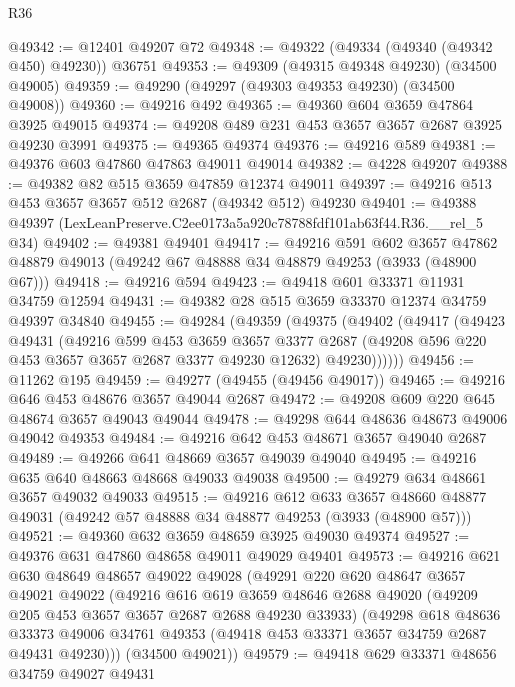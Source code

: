 \begin{lexlean}{R36}
\begin{coremodule}
@49342 := @12401 @49207 @72
@49348 := @49322 (@49334 (@49340 (@49342 @450) @49230)) @36751
@49353 := @49309 (@49315 @49348 @49230) (@34500 @49005)
@49359 := @49290 (@49297 (@49303 @49353 @49230) (@34500 @49008))
@49360 := @49216 @492
@49365 := @49360 @604 @3659 @47864 @3925 @49015
@49374 := @49208 @489 @231 @453 @3657 @3657 @2687 @3925 @49230 @3991
@49375 := @49365 @49374
@49376 := @49216 @589
@49381 := @49376 @603 @47860 @47863 @49011 @49014
@49382 := @4228 @49207
@49388 := @49382 @82 @515 @3659 @47859 @12374 @49011
@49397 := @49216 @513 @453 @3657 @3657 @512 @2687 (@49342 @512) @49230
@49401 := @49388 @49397 (LexLeanPreserve.C2ee0173a5a920c78788fdf101ab63f44.R36.__rel_5 @34)
@49402 := @49381 @49401
@49417 := @49216
    @591
    @602
    @3657
    @47862
    @48879
    @49013
    (@49242 @67 @48888 @34 @48879 @49253 (@3933 (@48900 @67)))
@49418 := @49216 @594
@49423 := @49418 @601 @33371 @11931 @34759 @12594
@49431 := @49382 @28 @515 @3659 @33370 @12374 @34759 @49397 @34840
@49455 := @49284
    (@49359
      (@49375
        (@49402
          (@49417
            (@49423
              @49431
              (@49216
                @599
                @453
                @3659
                @3657
                @3377
                @2687
                (@49208 @596 @220 @453 @3657 @3657 @2687 @3377 @49230 @12632)
                @49230))))))
@49456 := @11262 @195
@49459 := @49277 (@49455 (@49456 @49017))
@49465 := @49216 @646 @453 @48676 @3657 @49044 @2687
@49472 := @49208 @609 @220 @645 @48674 @3657 @49043 @49044
@49478 := @49298 @644 @48636 @48673 @49006 @49042 @49353
@49484 := @49216 @642 @453 @48671 @3657 @49040 @2687
@49489 := @49266 @641 @48669 @3657 @49039 @49040
@49495 := @49216 @635 @640 @48663 @48668 @49033 @49038
@49500 := @49279 @634 @48661 @3657 @49032 @49033
@49515 := @49216
    @612
    @633
    @3657
    @48660
    @48877
    @49031
    (@49242 @57 @48888 @34 @48877 @49253 (@3933 (@48900 @57)))
@49521 := @49360 @632 @3659 @48659 @3925 @49030 @49374
@49527 := @49376 @631 @47860 @48658 @49011 @49029 @49401
@49573 := @49216
    @621
    @630
    @48649
    @48657
    @49022
    @49028
    (@49291
      @220
      @620
      @48647
      @3657
      @49021
      @49022
      (@49216
        @616
        @619
        @3659
        @48646
        @2688
        @49020
        (@49209 @205 @453 @3657 @3657 @2687 @2688 @49230 @33933)
        (@49298
          @618
          @48636
          @33373
          @49006
          @34761
          @49353
          (@49418 @453 @33371 @3657 @34759 @2687 @49431 @49230)))
      (@34500 @49021))
@49579 := @49418 @629 @33371 @48656 @34759 @49027 @49431

\end{coremodule}
\end{lexlean}
